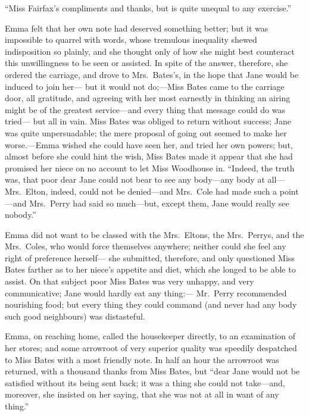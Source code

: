 ``Miss Fairfax's compliments and thanks, but is quite unequal
to any exercise.''

Emma felt that her own note had deserved something better; but it
was impossible to quarrel with words, whose tremulous inequality
shewed indisposition so plainly, and she thought only of how she
might best counteract this unwillingness to be seen or assisted.
In spite of the answer, therefore, she ordered the carriage, and drove
to Mrs.\ Bates's, in the hope that Jane would be induced to join her---%
but it would not do;---Miss Bates came to the carriage door, all gratitude,
and agreeing with her most earnestly in thinking an airing might be of
the greatest service---and every thing that message could do was tried---%
but all in vain.  Miss Bates was obliged to return without success;
Jane was quite unpersuadable; the mere proposal of going out
seemed to make her worse.---Emma wished she could have seen her,
and tried her own powers; but, almost before she could hint the wish,
Miss Bates made it appear that she had promised her niece on
no account to let Miss Woodhouse in.  ``Indeed, the truth was,
that poor dear Jane could not bear to see any body---any body at all---%
Mrs.\ Elton, indeed, could not be denied---and Mrs.\ Cole had made
such a point---and Mrs.\ Perry had said so much---but, except them,
Jane would really see nobody.''

Emma did not want to be classed with the Mrs.\ Eltons, the Mrs.\ Perrys,
and the Mrs.\ Coles, who would force themselves anywhere;
neither could she feel any right of preference herself---%
she submitted, therefore, and only questioned Miss Bates farther
as to her niece's appetite and diet, which she longed to be able
to assist.  On that subject poor Miss Bates was very unhappy,
and very communicative; Jane would hardly eat any thing:---%
Mr.\ Perry recommended nourishing food; but every thing they could
command (and never had any body such good neighbours) was distasteful.

Emma, on reaching home, called the housekeeper directly, to an
examination of her stores; and some arrowroot of very superior quality
was speedily despatched to Miss Bates with a most friendly note.
In half an hour the arrowroot was returned, with a thousand thanks
from Miss Bates, but ``dear Jane would not be satisfied without its
being sent back; it was a thing she could not take---and, moreover,
she insisted on her saying, that she was not at all in want of any thing.''

